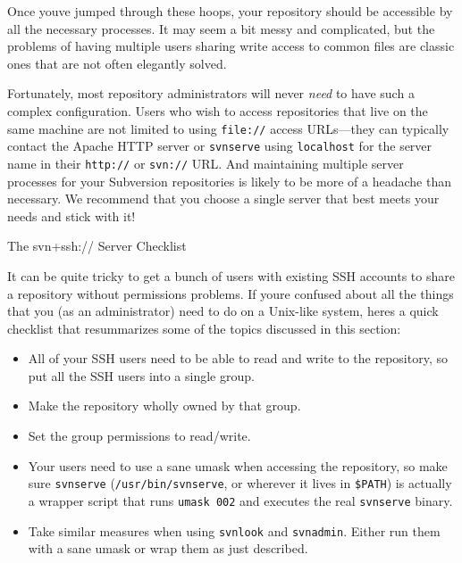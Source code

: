 Once you\textquotesingle ve jumped through these hoops, your repository
should be accessible by all the necessary processes. It may seem a bit
messy and complicated, but the problems of having multiple users sharing
write access to common files are classic ones that are not often
elegantly solved.

Fortunately, most repository administrators will never \emph{need} to
have such a complex configuration. Users who wish to access repositories
that live on the same machine are not limited to using \texttt{file://}
access URLs---they can typically contact the Apache HTTP server or
\texttt{svnserve} using \texttt{localhost} for the server name in their
\texttt{http://} or \texttt{svn://} URL. And maintaining multiple server
processes for your Subversion repositories is likely to be more of a
headache than necessary. We recommend that you choose a single server
that best meets your needs and stick with it!

The svn+ssh:// Server Checklist

It can be quite tricky to get a bunch of users with existing SSH
accounts to share a repository without permissions problems. If
you\textquotesingle re confused about all the things that you (as an
administrator) need to do on a Unix-like system, here\textquotesingle s
a quick checklist that resummarizes some of the topics discussed in this
section:

\begin{itemize}
\item
  All of your SSH users need to be able to read and write to the
  repository, so put all the SSH users into a single group.
\item
  Make the repository wholly owned by that group.
\item
  Set the group permissions to read/write.
\item
  Your users need to use a sane umask when accessing the repository, so
  make sure \texttt{svnserve} (\texttt{/usr/bin/svnserve}, or wherever
  it lives in \texttt{\$PATH}) is actually a wrapper script that runs
  \texttt{umask\ 002} and executes the real \texttt{svnserve} binary.
\item
  Take similar measures when using \texttt{svnlook} and
  \texttt{svnadmin}. Either run them with a sane umask or wrap them as
  just described.
\end{itemize}


